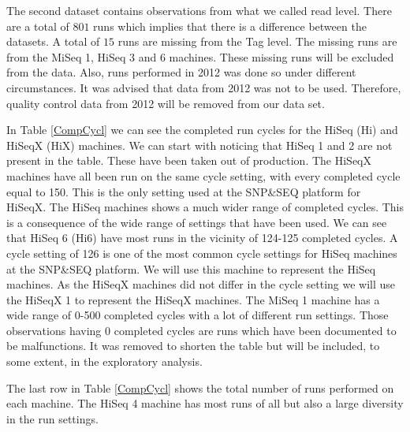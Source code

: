 \documentclass[a4paper,11pt,fleqn,twoside,notitlepage]{report}\usepackage[]{graphicx}\usepackage[]{color}
\begin{document}
The second dataset contains observations from what we called read level. There are a total of $801$ runs which implies that there is a difference between the datasets. A total of $15$ runs are missing from the Tag level. The missing runs are from the MiSeq 1, HiSeq 3 and 6 machines. These missing runs will be excluded from the data. Also, runs performed in 2012 was done so under different circumstances. It was advised that data from 2012 was not to be used. Therefore, quality control data from 2012 will be removed from our data set.

In Table \ref{CompCycl} we can see the completed run cycles for the HiSeq (Hi) and HiSeqX (HiX) machines. We can start with noticing that HiSeq 1 and 2 are not present in the table. These have been taken out of production. The HiSeqX machines have all been run on the same cycle setting, with every completed cycle equal to 150. This is the only setting used at the SNP\&SEQ platform for HiSeqX. The HiSeq machines shows a much wider range of completed cycles. This is a consequence of the wide range of settings that have been used. We can see that HiSeq 6 (Hi6) have most runs in the vicinity of 124-125 completed cycles. A cycle setting of 126 is one of the most common cycle settings for HiSeq machines at the SNP\&SEQ platform. We will use this machine to represent the HiSeq machines. As the HiSeqX machines did not differ in the cycle setting we will use the HiSeqX 1 to represent the HiSeqX machines. The MiSeq 1 machine has a wide range of 0-500 completed cycles with a lot of different run settings. Those observations having 0 completed cycles are runs which have been documented to be malfunctions. It was removed to shorten the table but will be included, to some extent, in the exploratory analysis.

The last row in Table \ref{CompCycl} shows the total number of runs performed on each machine. The HiSeq 4 machine has most runs of all but also a large diversity in the run settings. 
\end{document}
